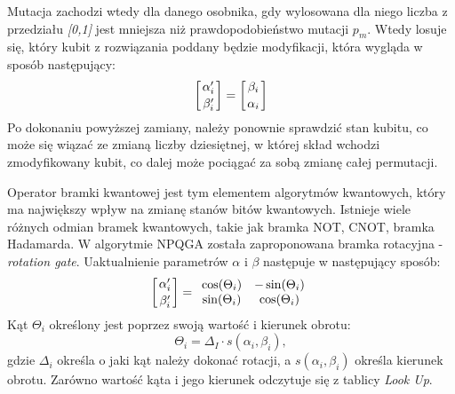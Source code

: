 Mutacja zachodzi wtedy dla danego osobnika, gdy wylosowana dla niego liczba z przedziału \textit{[0,1]} jest mniejsza niż prawdopodobieństwo mutacji $p_m$. Wtedy losuje się, który kubit z rozwiązania poddany będzie modyfikacji, która wygląda w sposób następujący:
\newline
\begin{equation}
\left[ {\alpha_i^\prime \atop \beta_i^\prime} \right] = \left[ {\beta_i \atop \alpha_i} \right]
\end{equation}
\newline
Po dokonaniu powyższej zamiany, należy ponownie sprawdzić stan kubitu, co może się wiązać ze zmianą liczby dziesiętnej, w której skład wchodzi zmodyfikowany kubit, co dalej może pociągać za sobą zmianę całej permutacji.

Operator bramki kwantowej jest tym elementem algorytmów kwantowych, który ma największy wpływ na zmianę stanów bitów kwantowych. Istnieje wiele różnych odmian bramek kwantowych, takie jak bramka NOT, CNOT, bramka Hadamarda. W algorytmie NPQGA została zaproponowana bramka rotacyjna - \textit{rotation gate}. Uaktualnienie parametrów \textit{$\alpha$} i \textit{$\beta$} następuje w następujący sposób:
\newline
\begin{equation}
\left[ {\alpha_i^\prime \atop \beta_i^\prime} \right] = \begin{array}{ccc}
\cos(\Theta_i) & -\sin(\Theta_i) \\ \sin(\Theta_i) & \cos(\Theta_i)
\end{array}
\end{equation}
\newline
Kąt $\Theta_i$ określony jest poprzez swoją wartość i kierunek obrotu:
\newline
\begin{equation}
\Theta_i=\Delta_I \cdot s(\alpha_i, \beta_i),
\end{equation}
\newline
gdzie $\Delta_i$ określa o jaki kąt należy dokonać rotacji, a $s(\alpha_i, \beta_i)$ określa kierunek obrotu. Zarówno wartość kąta i jego kierunek  odczytuje się z tablicy \textit{Look Up}.
\label{cha:qap_ea}